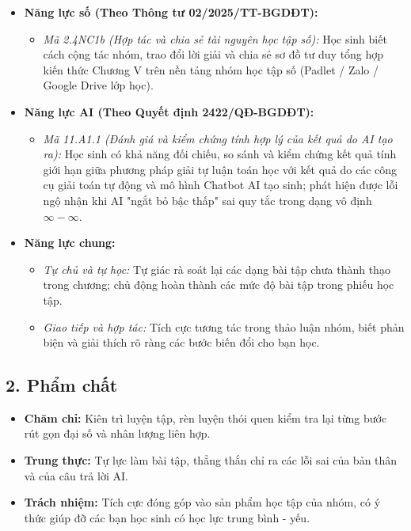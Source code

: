 \documentclass[12pt, a4paper]{article}
\begin{document}
\begin{itemize}[leftmargin=1.2cm]
    \item \textbf{Năng lực số (Theo Thông tư 02/2025/TT-BGDĐT):}
    \begin{itemize}[leftmargin=0.6cm]
        \item \textit{Mã 2.4NC1b (Hợp tác và chia sẻ tài nguyên học tập số):} Học sinh biết cách cộng tác nhóm, trao đổi lời giải và chia sẻ sơ đồ tư duy tổng hợp kiến thức Chương V trên nền tảng nhóm học tập số (Padlet / Zalo / Google Drive lớp học).
    \end{itemize}

    \item \textbf{Năng lực AI (Theo Quyết định 2422/QĐ-BGDĐT):}
    \begin{itemize}[leftmargin=0.6cm]
        \item \textit{Mã 11.A1.1 (Đánh giá và kiểm chứng tính hợp lý của kết quả do AI tạo ra):} Học sinh có khả năng đối chiếu, so sánh và kiểm chứng kết quả tính giới hạn giữa phương pháp giải tự luận toán học với kết quả do các công cụ giải toán tự động và mô hình Chatbot AI tạo sinh; phát hiện được lỗi ngộ nhận khi AI "ngắt bỏ bậc thấp" sai quy tắc trong dạng vô định $\infty - \infty$.
    \end{itemize}

    \item \textbf{Năng lực chung:}
    \begin{itemize}[leftmargin=0.6cm]
        \item \textit{Tự chủ và tự học:} Tự giác rà soát lại các dạng bài tập chưa thành thạo trong chương; chủ động hoàn thành các mức độ bài tập trong phiếu học tập.
        \item \textit{Giao tiếp và hợp tác:} Tích cực tương tác trong thảo luận nhóm, biết phản biện và giải thích rõ ràng các bước biến đổi cho bạn học.
    \end{itemize}
\end{itemize}

\subsection*{2. Phẩm chất}

\begin{itemize}[leftmargin=1.2cm]
    \item \textbf{Chăm chỉ:} Kiên trì luyện tập, rèn luyện thói quen kiểm tra lại từng bước rút gọn đại số và nhân lượng liên hợp.
    \item \textbf{Trung thực:} Tự lực làm bài tập, thẳng thắn chỉ ra các lỗi sai của bản thân và của câu trả lời AI.
    \item \textbf{Trách nhiệm:} Tích cực đóng góp vào sản phẩm học tập của nhóm, có ý thức giúp đỡ các bạn học sinh có học lực trung bình - yếu.
\end{itemize}
\end{document}
